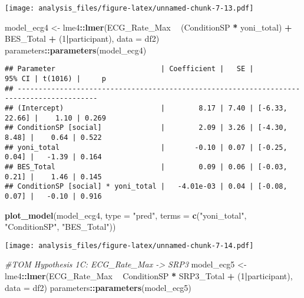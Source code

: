 \documentclass[
]{article}
\newenvironment{Shaded}{\begin{snugshade}}{\end{snugshade}}
\newcommand{\CommentTok}[1]{\textcolor[rgb]{0.56,0.35,0.01}{\textit{#1}}}
\newcommand{\DataTypeTok}[1]{\textcolor[rgb]{0.13,0.29,0.53}{#1}}
\newcommand{\DecValTok}[1]{\textcolor[rgb]{0.00,0.00,0.81}{#1}}
\newcommand{\KeywordTok}[1]{\textcolor[rgb]{0.13,0.29,0.53}{\textbf{#1}}}
\newcommand{\NormalTok}[1]{#1}
\newcommand{\OperatorTok}[1]{\textcolor[rgb]{0.81,0.36,0.00}{\textbf{#1}}}
\newcommand{\StringTok}[1]{\textcolor[rgb]{0.31,0.60,0.02}{#1}}
\begin{document}
\texttt{[image: analysis\_files/figure-latex/unnamed-chunk-7-13.pdf]}

\begin{Shaded}
\begin{Highlighting}[]
\NormalTok{model_ecg4 <-}\StringTok{ }\NormalTok{lme4}\OperatorTok{::}\KeywordTok{lmer}\NormalTok{(ECG_Rate_Max }\OperatorTok{~}\StringTok{ }\NormalTok{(ConditionSP }\OperatorTok{*}\StringTok{ }\NormalTok{yoni_total) }\OperatorTok{+}\StringTok{ }\NormalTok{BES_Total }\OperatorTok{+}\StringTok{ }\NormalTok{(}\DecValTok{1}\OperatorTok{|}\NormalTok{participant), }\DataTypeTok{data =}\NormalTok{ df2)}
\NormalTok{parameters}\OperatorTok{::}\KeywordTok{parameters}\NormalTok{(model_ecg4)}
\end{Highlighting}
\end{Shaded}

\begin{verbatim}
## Parameter                         | Coefficient |   SE |         95% CI | t(1016) |     p
## -----------------------------------------------------------------------------------------
## (Intercept)                       |        8.17 | 7.40 | [-6.33, 22.66] |    1.10 | 0.269
## ConditionSP [social]              |        2.09 | 3.26 | [-4.30,  8.48] |    0.64 | 0.522
## yoni_total                        |       -0.10 | 0.07 | [-0.25,  0.04] |   -1.39 | 0.164
## BES_Total                         |        0.09 | 0.06 | [-0.03,  0.21] |    1.46 | 0.145
## ConditionSP [social] * yoni_total |   -4.01e-03 | 0.04 | [-0.08,  0.07] |   -0.10 | 0.916
\end{verbatim}

\begin{Shaded}
\begin{Highlighting}[]
\KeywordTok{plot_model}\NormalTok{(model_ecg4, }\DataTypeTok{type =} \StringTok{"pred"}\NormalTok{, }\DataTypeTok{terms =} \KeywordTok{c}\NormalTok{(}\StringTok{"yoni_total"}\NormalTok{, }\StringTok{"ConditionSP"}\NormalTok{, }\StringTok{"BES_Total"}\NormalTok{))}
\end{Highlighting}
\end{Shaded}

\texttt{[image: analysis\_files/figure-latex/unnamed-chunk-7-14.pdf]}

\begin{Shaded}
\begin{Highlighting}[]
\CommentTok{#TOM Hypothesis 1C: ECG_Rate_Max -> SRP3}
\NormalTok{model_ecg5 <-}\StringTok{ }\NormalTok{lme4}\OperatorTok{::}\KeywordTok{lmer}\NormalTok{(ECG_Rate_Max }\OperatorTok{~}\StringTok{ }\NormalTok{ConditionSP }\OperatorTok{*}\StringTok{ }\NormalTok{SRP3_Total }\OperatorTok{+}\StringTok{ }\NormalTok{(}\DecValTok{1}\OperatorTok{|}\NormalTok{participant), }\DataTypeTok{data =}\NormalTok{ df2)}
\NormalTok{parameters}\OperatorTok{::}\KeywordTok{parameters}\NormalTok{(model_ecg5)}
\end{Highlighting}
\end{Shaded}
\end{document}
